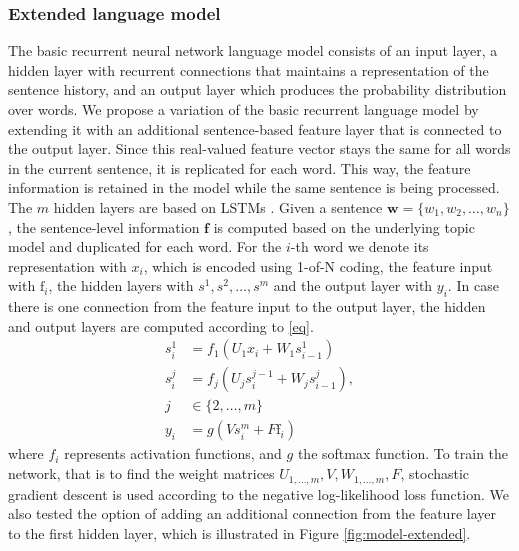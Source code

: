 \documentclass[a4paper]{article}
\begin{document}
\subsubsection{Extended language model}
The basic recurrent neural network language model consists of an input layer, a hidden layer with recurrent connections that maintains a representation of the sentence history, and an output layer which produces the probability distribution over words.
We propose a variation of the basic recurrent language model by extending it with an additional sentence-based feature layer that is connected to the output layer. Since this real-valued feature vector stays the same for all words in the current sentence, it is replicated for each word. This way, the feature information is retained in the model while the same sentence is being processed.
The $m$ hidden layers are based on LSTMs \cite{hochreiter1997long}.
Given a sentence $\textbf{w} = \{w_1, w_2, \ldots, w_n\}$, the sentence-level information $\textbf{f}$ is computed based on the underlying topic model and duplicated for each word. For the $i$-th word we denote its representation with $x_i$, which is encoded using 1-of-N coding, the feature input with $\text{f}_i$, the hidden layers with $s^1, s^2, \dots, s^m$ and the output layer with $y_i$. In case there is one connection from the feature input to the output layer, the hidden and output layers are computed according to \eqref{eq}.
\begin{equation}
\label{eq}
\begin{aligned}
s^1_i &= f_1(U_1x_i + W_1s^1_{i-1}) \\
s^j_i &= f_j(U_js^{j-1}_i + W_js^j_{i-1}), \\j &\in \{2,\ldots,m\} \\
y_i &= g(Vs^m_i + F\text{f}_i)
\end{aligned}
\end{equation}
where $f_i$ represents activation functions, and $g$ the softmax function.
To train the network, that is to find the weight matrices $U_{1,\dots,m}, V, W_{1,\dots,m}, F$, stochastic gradient descent is used according to the negative log-likelihood loss function. We also tested the option of adding an additional connection from the feature layer to the first hidden layer, which is illustrated in Figure \ref{fig:model-extended}.
\end{document}

